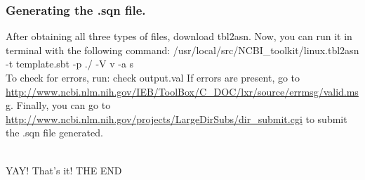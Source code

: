 \documentclass[11pt]{article}
\begin{document}
\subsubsection{Generating the .sqn file.}
After obtaining all three types of files, download tbl2asn. Now, you can run it in terminal with the following command: /usr/local/src/NCBI\_toolkit/linux.tbl2asn -t template.sbt -p ./ -V v -a s  \\
To check for errors, run:  check output.val   If errors are present, go to \url{http://www.ncbi.nlm.nih.gov/IEB/ToolBox/C_DOC/lxr/source/errmsg/valid.msg}. Finally, you can go to \url{http://www.ncbi.nlm.nih.gov/projects/LargeDirSubs/dir_submit.cgi} to submit the .sqn file generated.
\\
\\
\begin{displayquote}
\Huge{YAY! That's it! THE END~\smiley}
\end{displayquote}

\label{pdf:template}

\end{document}
